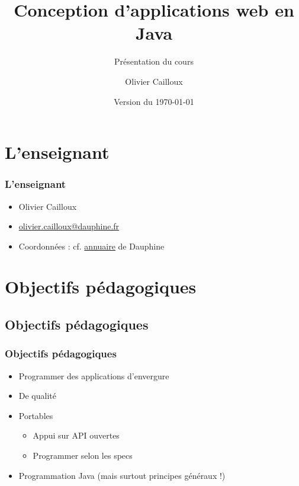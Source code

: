 \documentclass[english, french]{beamer}
\title{Conception d’applications web en Java}
\subtitle{Présentation du cours}
\author{Olivier Cailloux}
\institute[LAMSADE]{LAMSADE, Université Paris-Dauphine}
\date{Version du \today}
\begin{document}


\begin{frame}[plain]
   \titlepage
\end{frame}
\addtocounter{framenumber}{-1}

\section{L’enseignant}
\begin{frame}
	\frametitle{L’enseignant}
	\begin{itemize}
		\item Olivier Cailloux
		\item \href{mailto:olivier.cailloux@dauphine.fr}{olivier.cailloux@dauphine.fr}
		\item Coordonnées : cf. \href{https://www.ent.dauphine.fr/Annuaire/index.php?param0=fiche&param1=ocailloux}{annuaire} de Dauphine
	\end{itemize}
\end{frame}

\section[Obj. pédagogiques]{Objectifs pédagogiques}
\subsection{Objectifs pédagogiques}
\begin{frame}
	\frametitle{Objectifs pédagogiques}
	\begin{itemize}
		\item Programmer des applications d’envergure
		\item De qualité
		\item Portables
		\begin{itemize}
			\item Appui sur API ouvertes
			\item Programmer selon les specs
		\end{itemize}
		\item Programmation Java (mais surtout principes généraux !)
	\end{itemize}
\end{frame}
\end{document}
